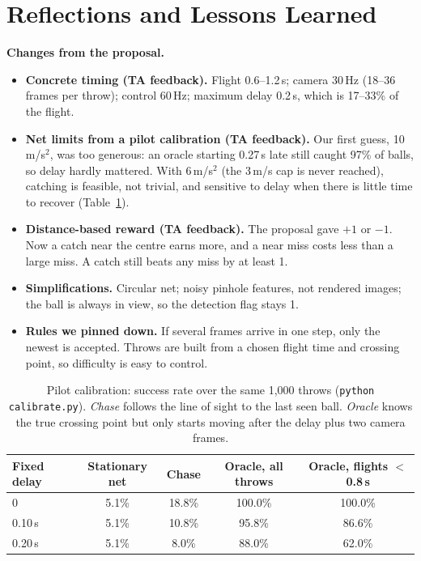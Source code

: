 \documentclass[10pt,a4paper]{article}
\newcommand{\code}[1]{\texttt{#1}}
\begin{document}
\section{Reflections and Lessons Learned}

\textbf{Changes from the proposal.}
\begin{itemize}
  \item \textbf{Concrete timing (TA feedback).} Flight 0.6--1.2\,s; camera 30\,Hz (18--36 frames per
        throw); control 60\,Hz; maximum delay 0.2\,s, which is 17--33\% of the flight.
  \item \textbf{Net limits from a pilot calibration (TA feedback).} Our first guess, 10\,m/s$^2$, was
        too generous: an oracle starting 0.27\,s late still caught 97\% of balls, so delay hardly
        mattered. With 6\,m/s$^2$ (the 3\,m/s cap is never reached), catching is feasible, not trivial,
        and sensitive to delay when there is little time to recover (Table~\ref{tab:calibration}).
  \item \textbf{Distance-based reward (TA feedback).} The proposal gave $+1$ or $-1$. Now a catch near
        the centre earns more, and a near miss costs less than a large miss. A catch still beats any
        miss by at least 1.
  \item \textbf{Simplifications.} Circular net; noisy pinhole features, not rendered images; the ball is
        always in view, so the detection flag stays 1.
  \item \textbf{Rules we pinned down.} If several frames arrive in one step, only the newest is accepted.
        Throws are built from a chosen flight time and crossing point, so difficulty is easy to control.
\end{itemize}

\begin{table}[h!]
  \centering
  \caption{Pilot calibration: success rate over the same 1,000 throws (\code{python calibrate.py}).
    \emph{Chase} follows the line of sight to the last seen ball. \emph{Oracle} knows the true crossing
    point but only starts moving after the delay plus two camera frames.}
  \label{tab:calibration}
  \small
  \begin{tabular}{@{}lcccc@{}}
    \toprule
    Fixed delay & Stationary net & Chase & Oracle, all throws & Oracle, flights $<$ 0.8\,s \\
    \midrule
    0       & 5.1\% & 18.8\% & 100.0\% & 100.0\% \\
    0.10\,s & 5.1\% & 10.8\% &  95.8\% &  86.6\% \\
    0.20\,s & 5.1\% &  8.0\% &  88.0\% &  62.0\% \\
    \bottomrule
  \end{tabular}
\end{table}
\end{document}
